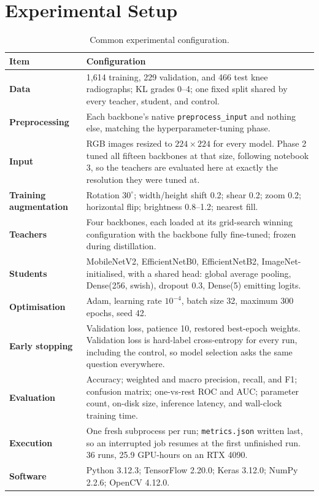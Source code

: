 \documentclass[10pt,letterpaper]{article}
\begin{document}
\section{Experimental Setup}
\begin{table}[H]
\centering
\small
\caption{Common experimental configuration.}
\begin{tabularx}{\textwidth}{@{}>{\bfseries}lX@{}}
\toprule
Item & Configuration \\
\midrule
Data & 1,614 training, 229 validation, and 466 test knee radiographs; KL grades 0--4; one fixed split
shared by every teacher, student, and control. \\
Preprocessing & Each backbone's native \texttt{preprocess\_input} and nothing else, matching the
hyperparameter-tuning phase. \\
Input & RGB images resized to $224\times224$ for every model. Phase 2 tuned all fifteen backbones at that
size, following notebook 3, so the teachers are evaluated here at exactly the resolution they were tuned
at. \\
Training augmentation & Rotation $30^\circ$; width/height shift 0.2; shear 0.2; zoom 0.2; horizontal flip;
brightness 0.8--1.2; nearest fill. \\
Teachers & Four backbones, each loaded at its grid-search winning configuration with the backbone fully
fine-tuned; frozen during distillation. \\
Students & MobileNetV2, EfficientNetB0, EfficientNetB2, ImageNet-initialised, with a shared head: global
average pooling, Dense(256, swish), dropout 0.3, Dense(5) emitting logits. \\
Optimisation & Adam, learning rate $10^{-4}$, batch size 32, maximum 300 epochs, seed 42. \\
Early stopping & Validation loss, patience 10, restored best-epoch weights. Validation loss is hard-label
cross-entropy for every run, including the control, so model selection asks the same question everywhere. \\
Evaluation & Accuracy; weighted and macro precision, recall, and F1; confusion matrix; one-vs-rest ROC and
AUC; parameter count, on-disk size, inference latency, and wall-clock training time. \\
Execution & One fresh subprocess per run; \texttt{metrics.json} written last, so an interrupted job resumes
at the first unfinished run. 36 runs, 25.9 GPU-hours on an RTX 4090. \\
Software & Python 3.12.3; TensorFlow 2.20.0; Keras 3.12.0; NumPy 2.2.6; OpenCV 4.12.0. \\
\bottomrule
\end{tabularx}
\end{table}
\end{document}
